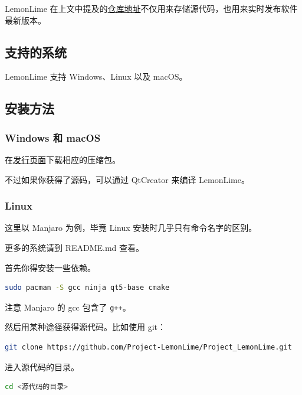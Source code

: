 \documentclass[UTF-8]{ctexart}
\begin{document}
		LemonLime 在上文中提及的\href{https://github.com/Project-LemonLime/Project_LemonLime}{仓库地址}不仅用来存储源代码，也用来实时发布软件最新版本。
		
		\subsection{支持的系统}
		
			LemonLime 支持 Windows、Linux 以及 macOS。
			
		\subsection{安装方法}
			
			\subsubsection{Windows 和 macOS}
			
				在\href{https://github.com/Project-LemonLime/Project_LemonLime/releases}{发行页面}下载相应的压缩包。
				
				不过如果你获得了源码，可以通过 QtCreator 来编译 LemonLime。
			
			\subsubsection{Linux}
                
				这里以 Manjaro 为例，毕竟 Linux 安装时几乎只有命令名字的区别。
				
				更多的系统请到 README.md 查看。
				
				首先你得安装一些依赖。
				
				\begin{lstlisting}[language=bash,frame=shadowbox,basicstyle=\ttfamily]
sudo pacman -S gcc ninja qt5-base cmake
				\end{lstlisting}
				
				注意 Manjaro 的 gcc 包含了 \texttt{g++}。
				
				然后用某种途径获得源代码。比如使用 git：
				
				\begin{lstlisting}[language=bash,frame=shadowbox,basicstyle=\ttfamily]
git clone https://github.com/Project-LemonLime/Project_LemonLime.git
				\end{lstlisting}
				
				进入源代码的目录。
				
				\begin{lstlisting}[language=bash,frame=shadowbox,basicstyle=\ttfamily]
cd <源代码的目录>
				\end{lstlisting}
				
\end{document}
